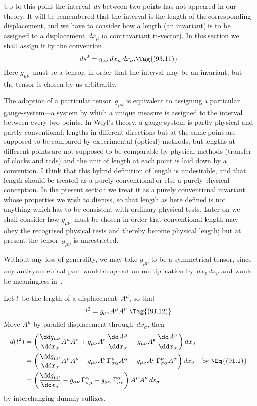 \documentclass[12pt]{book}
\begin{document}
%

Up to this point the interval~$ds$ between two points has not appeared in
our theory. It will be remembered that the interval is the length of the corresponding
displacement, and we have to consider how a length (an invariant)
is to be assigned to a displacement~$dx_{\mu}$ (a contravariant in-vector). In this
section we shall assign it by the convention
\[
ds^{2} = g_{\mu\nu}\, dx_{\mu}\, dx_{\nu}.
\Tag{(93.11)}
\]
Here $g_{\mu\nu}$~must be a tensor, in order that the interval may be an invariant;
but the tensor is chosen by us arbitrarily.

The adoption of a particular tensor~$g_{\mu\nu}$ is equivalent to assigning a particular
gauge-system---a system by which a unique measure is assigned to the interval
%
between every two points. In Weyl's theory, a gauge-system is partly physical
and partly conventional; lengths in different directions but at the same point
are supposed to be compared by experimental (optical) methods; but lengths
at different points are not supposed to be comparable by physical methods
(transfer of clocks and rods) and the unit of length at each point is laid down
%
by a convention. I think that this hybrid definition of length is undesirable,
and that length should be treated as a purely conventional or else a purely
physical conception. In the present section we treat it as a purely conventional
invariant whose properties we wish to discuss, so that length as here
defined is not anything which has to be consistent with ordinary physical tests.
Later on we shall consider how $g_{\mu\nu}$~must be chosen in order that conventional
length may obey the recognised physical tests and thereby become physical
length; but at present the tensor~$g_{\mu\nu}$ is unrestricted.

Without any loss of generality, we may take $g_{\mu\nu}$ to be a symmetrical tensor,
since any antisymmetrical part would drop out on multiplication by~$dx_{\mu}\, dx_{\nu}$
and would be meaningless in~.

Let $l$~be the length of a displacement~$A^{\mu}$, so that
\[
l^{2} = g_{\mu\nu} A^{\mu} A^{\nu}.
\Tag{(93.12)}
\]
Move $A^{\mu}$ by parallel displacement through~$dx_{\sigma}$, then
\begin{align*}
  d(l^{2})
  &= \left(\frac{\dd g_{\mu\nu}}{\dd x_{\sigma}} A^{\mu} A^{\nu}
  + g_{\mu\nu} A^{\nu}\, \frac{\dd A^{\mu}}{\dd x_{\sigma}}
  + g_{\mu\nu} A^{\mu}\, \frac{\dd A^{\nu}}{\dd x_{\sigma}}\right) dx_{\sigma} \\
  &= \left(\frac{\dd g_{\mu\nu}}{\dd x_{\sigma}} A^{\mu} A^{\nu}
  - g_{\mu\nu} A^{\nu}\, \Gamma_{\sigma\alpha}^{\mu} A^{\alpha}
  - g_{\mu\nu} A^{\mu}\, \Gamma_{\sigma\alpha}^{\nu} A^{\alpha}\right) dx_{\sigma}
  \quad\text{by~\Eq{(91.1)}} \\
  &= \left(\frac{\dd g_{\mu\nu}}{\dd x_{\sigma}}
  - g_{\alpha\nu}\, \Gamma_{\sigma\mu}^{\alpha}
  - g_{\mu\alpha}\, \Gamma_{\sigma\nu}^{\alpha}\right) A^{\mu} A^{\nu}\, dx_{\sigma}
\end{align*}
by interchanging dummy suffixes.
\end{document}
